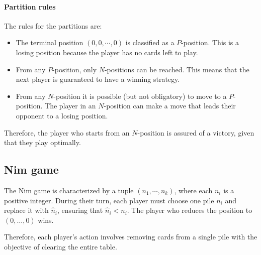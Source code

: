 \paragraph*{Partition rules}
The rules for the partitions are:
\begin{itemize}
    \item The terminal position $(0, 0, \cdots, 0)$ is classified as a $P$-position. 
        This is a losing position because the player has no cards left to play.
    \item From any $P$-position, only $N$-positions can be reached. 
        This means that the next player is guaranteed to have a winning strategy.
    \item From any $N$-position it is possible (but not obligatory) to move to a $P$-position. 
        The player in an $N$-position can make a move that leads their opponent to a losing position.
\end{itemize}
Therefore, the player who starts from an $N$-position is assured of a victory, given that they play optimally. 

\subsection{Nim game}
The Nim game is characterized by a tuple $(n_1, \cdots, n_k)$, where each $n_i$ is a positive integer.
During their turn, each player must choose one pile $n_i$ and replace it with $\hat{n}_i$, ensuring that $\hat{n}_i < n_i$. 
The player who reduces the position to $(0, \dots, 0)$ wins. 

Therefore, each player's action involves removing cards from a single pile with the objective of clearing the entire table.

